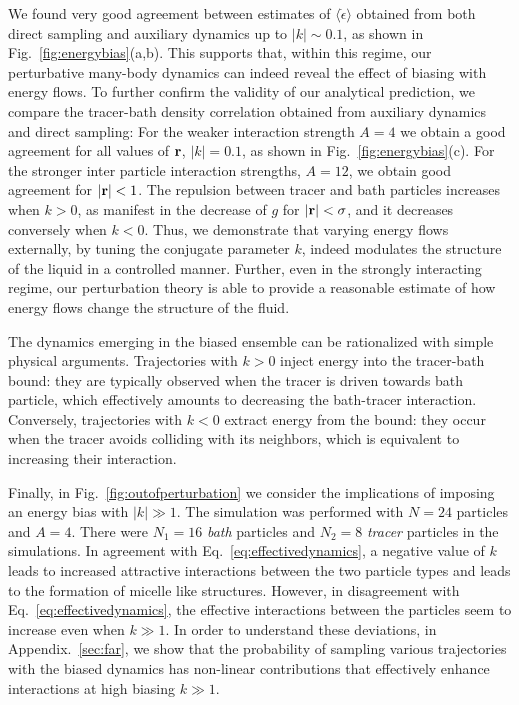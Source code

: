 \documentclass[pre, superscriptaddress, twocolumn,pre]{revtex4-1}
\begin{document}
We found very good agreement between estimates of $\langle \dot{\epsilon}\rangle$ obtained from both direct sampling and auxiliary dynamics up to $|k|\sim 0.1$, as shown in Fig.~\ref{fig:energybias}(a,b). This supports that, within this regime, our perturbative many-body dynamics can indeed reveal the effect of biasing with energy flows. To further confirm the validity of our analytical prediction, we compare the tracer-bath density correlation obtained from auxiliary dynamics and direct sampling: For the weaker interaction strength $A=4$ we obtain a good agreement for all values of ${\bf r}$, $|k|=0.1$, as shown in Fig.~\ref{fig:energybias}(c). For the stronger inter particle interaction strengths, $A=12$, we obtain good agreement for $|{\bf r }|<1$.  The repulsion between tracer and bath particles increases when $k>0$, as manifest in the decrease of $g$ for $|{\bf r}|<\sigma$, and it decreases conversely when $k<0$. Thus, we demonstrate that varying energy flows externally, by tuning the conjugate parameter $k$, indeed modulates the structure of the liquid in a controlled manner. Further, even in the strongly interacting regime, our perturbation theory is able to provide a reasonable estimate of how energy flows change the structure of the fluid. 

The dynamics emerging in the biased ensemble can be rationalized with simple physical arguments. Trajectories with $k>0$ inject energy into the tracer-bath bound: they are typically observed when the tracer is driven towards bath particle, which effectively amounts to decreasing the bath-tracer interaction. Conversely, trajectories with $k<0$ extract energy from the bound: they occur when the tracer avoids colliding with its neighbors, which is equivalent to increasing their interaction. 

Finally, in Fig.~\ref{fig:outofperturbation} we consider the implications of imposing an energy bias with $|k| \gg 1$. The simulation was performed with $N=24$ particles and $A=4$. There were $N_1=16$ \textit{bath} particles and $N_2=8$ \textit{tracer} particles in the simulations. In agreement with Eq.~\ref{eq:effectivedynamics}, a negative value of $k$ leads to increased attractive interactions between the two particle types and leads to the formation of micelle like structures. However, in disagreement with Eq.~\ref{eq:effectivedynamics}, the effective interactions between the particles seem to increase even when $k \gg 1$. In order to understand these deviations, in Appendix.~\ref{sec:far}, we show that the probability of sampling various trajectories with the biased dynamics has non-linear contributions that effectively enhance interactions at high biasing $k\gg 1$. 
\end{document}
